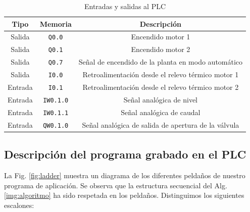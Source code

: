 \begin{table}[!t]
\renewcommand{\arraystretch}{1.3}
\centering
\begin{tabular}{c||c||c}
\hline
\bfseries Tipo & \bfseries Memoria & \bfseries Descripción\\
\hline \hline
Salida & \verb|Q0.0|  & Encendido motor 1\\
Salida & \verb|Q0.1|  & Encendido motor 2\\
Salida & \verb|Q0.7|  & Señal de encendido de la planta en modo automático\\
Salida & \verb|I0.0|  & Retroalimentación desde el relevo térmico motor 1\\
\hline
Entrada & \verb|I0.1|  & Retroalimentación desde el relevo térmico motor 2\\
Entrada & \verb|IW0.1.0|  & Señal analógica de nivel\\
Entrada & \verb|IW0.1.1|  & Señal analógica de caudal \\
Entrada & \verb|QW0.1.0|  & Señal analógica de salida de apertura de la válvula
\\
\hline
\end{tabular}
\caption{Entradas y salidas al PLC}
\label{table:entradassalidas}
\end{table}

\subsection{Descripción del programa grabado en el PLC}

La Fig. \ref{fig:ladder} muestra un diagrama de los diferentes peldaños de
nuestro programa de aplicación.
Se observa que la estructura secuencial del Alg. \ref{img:algoritmo} ha
sido respetada en los peldaños.
Distinguimos los siguientes escalones:

